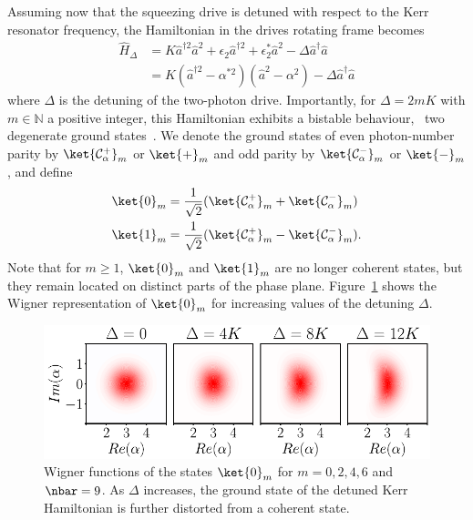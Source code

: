 Assuming now that the squeezing drive is detuned with respect to the Kerr resonator frequency, the  Hamiltonian in the drives rotating frame becomes 
\begin{equation}
    \begin{split}
        \hat{H}_\Delta &= K\hat{a}^{\dagger 2}\hat{a}^{ 2} + \epsilon_2 \hat{a}^{\dagger 2} + \epsilon_2^* \hat{a}^{2} - \Delta  \hat{a}^{\dag} \hat{a} \\
        &= K(\hat{a}^{\dagger 2} - \alpha^{*2})(\hat{a}^{ 2} - \alpha^2) - \Delta  \hat{a}^{\dag} \hat{a}
    \label{eq:DKerr}
    \end{split}
\end{equation}
where $\Delta$ is the detuning of the two-photon drive. Importantly, for $\Delta = 2mK$ with $m \in \mathbb{N}$ a positive integer, this Hamiltonian exhibits a bistable behaviour, \ie~two degenerate ground states~\cite{Roberts2019}. We denote the ground states of even photon-number parity by $\ket{\mathcal{C}_\alpha^+}_m$ or $\ket{+}_m$ and odd parity by $\ket{\mathcal{C}_\alpha^-}_m$ or $\ket{-}_m$, and define
\begin{equation}
    \begin{split}
        &\ket{0}_m=\frac{1}{\sqrt{2}}(\ket{\mathcal{C}_\alpha^+}_m+\ket{\mathcal{C}_\alpha^-}_m) \\
        &\ket{1}_m=\frac{1}{\sqrt{2}}(\ket{\mathcal{C}_\alpha^+}_m-\ket{\mathcal{C}_\alpha^-}_m).
        \label{newstates}
    \end{split}
\end{equation} 
Note that for $m \geq 1$, $\ket{0}_m$ and $\ket{1}_m$ are no longer coherent states, but they remain located on distinct parts of the phase plane. Figure~\ref{fig:wigner} shows the Wigner representation of $\ket{0}_m$ for increasing values of the detuning $\Delta$.

\begin{figure}[t!]
    \centering
    \includegraphics[width=\columnwidth]{file/image/Banane_V2.pdf}
    \vspace{-0.5cm}
    \caption{\label{fig:wigner}
    Wigner functions of the states $\ket{0}_{m}$ for $m=0,2,4,6$ and $\nbar = 9$. As $\Delta$ increases, the ground state of the detuned Kerr Hamiltonian is further distorted from a coherent state.}
\end{figure}

